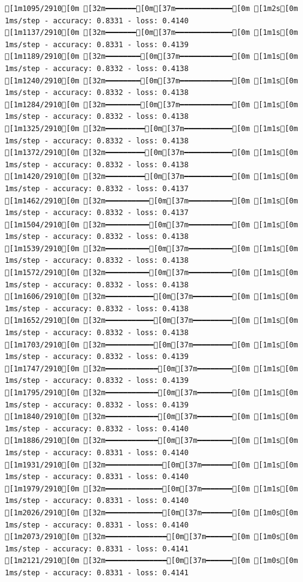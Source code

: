 \documentclass[
  letterpaper,
  DIV=11,
  numbers=noendperiod]{scrartcl}
\begin{document}
\begin{verbatim}
[1m1095/2910[0m [32m━━━━━━━[0m[37m━━━━━━━━━━━━━[0m [1m2s[0m 1ms/step - accuracy: 0.8331 - loss: 0.4140
[1m1137/2910[0m [32m━━━━━━━[0m[37m━━━━━━━━━━━━━[0m [1m1s[0m 1ms/step - accuracy: 0.8331 - loss: 0.4139
[1m1189/2910[0m [32m━━━━━━━━[0m[37m━━━━━━━━━━━━[0m [1m1s[0m 1ms/step - accuracy: 0.8332 - loss: 0.4138
[1m1240/2910[0m [32m━━━━━━━━[0m[37m━━━━━━━━━━━━[0m [1m1s[0m 1ms/step - accuracy: 0.8332 - loss: 0.4138
[1m1284/2910[0m [32m━━━━━━━━[0m[37m━━━━━━━━━━━━[0m [1m1s[0m 1ms/step - accuracy: 0.8332 - loss: 0.4138
[1m1325/2910[0m [32m━━━━━━━━━[0m[37m━━━━━━━━━━━[0m [1m1s[0m 1ms/step - accuracy: 0.8332 - loss: 0.4138
[1m1372/2910[0m [32m━━━━━━━━━[0m[37m━━━━━━━━━━━[0m [1m1s[0m 1ms/step - accuracy: 0.8332 - loss: 0.4138
[1m1420/2910[0m [32m━━━━━━━━━[0m[37m━━━━━━━━━━━[0m [1m1s[0m 1ms/step - accuracy: 0.8332 - loss: 0.4137
[1m1462/2910[0m [32m━━━━━━━━━━[0m[37m━━━━━━━━━━[0m [1m1s[0m 1ms/step - accuracy: 0.8332 - loss: 0.4137
[1m1504/2910[0m [32m━━━━━━━━━━[0m[37m━━━━━━━━━━[0m [1m1s[0m 1ms/step - accuracy: 0.8332 - loss: 0.4138
[1m1539/2910[0m [32m━━━━━━━━━━[0m[37m━━━━━━━━━━[0m [1m1s[0m 1ms/step - accuracy: 0.8332 - loss: 0.4138
[1m1572/2910[0m [32m━━━━━━━━━━[0m[37m━━━━━━━━━━[0m [1m1s[0m 1ms/step - accuracy: 0.8332 - loss: 0.4138
[1m1606/2910[0m [32m━━━━━━━━━━━[0m[37m━━━━━━━━━[0m [1m1s[0m 1ms/step - accuracy: 0.8332 - loss: 0.4138
[1m1652/2910[0m [32m━━━━━━━━━━━[0m[37m━━━━━━━━━[0m [1m1s[0m 1ms/step - accuracy: 0.8332 - loss: 0.4138
[1m1703/2910[0m [32m━━━━━━━━━━━[0m[37m━━━━━━━━━[0m [1m1s[0m 1ms/step - accuracy: 0.8332 - loss: 0.4139
[1m1747/2910[0m [32m━━━━━━━━━━━━[0m[37m━━━━━━━━[0m [1m1s[0m 1ms/step - accuracy: 0.8332 - loss: 0.4139
[1m1795/2910[0m [32m━━━━━━━━━━━━[0m[37m━━━━━━━━[0m [1m1s[0m 1ms/step - accuracy: 0.8332 - loss: 0.4139
[1m1840/2910[0m [32m━━━━━━━━━━━━[0m[37m━━━━━━━━[0m [1m1s[0m 1ms/step - accuracy: 0.8332 - loss: 0.4140
[1m1886/2910[0m [32m━━━━━━━━━━━━[0m[37m━━━━━━━━[0m [1m1s[0m 1ms/step - accuracy: 0.8331 - loss: 0.4140
[1m1931/2910[0m [32m━━━━━━━━━━━━━[0m[37m━━━━━━━[0m [1m1s[0m 1ms/step - accuracy: 0.8331 - loss: 0.4140
[1m1979/2910[0m [32m━━━━━━━━━━━━━[0m[37m━━━━━━━[0m [1m1s[0m 1ms/step - accuracy: 0.8331 - loss: 0.4140
[1m2026/2910[0m [32m━━━━━━━━━━━━━[0m[37m━━━━━━━[0m [1m0s[0m 1ms/step - accuracy: 0.8331 - loss: 0.4140
[1m2073/2910[0m [32m━━━━━━━━━━━━━━[0m[37m━━━━━━[0m [1m0s[0m 1ms/step - accuracy: 0.8331 - loss: 0.4141
[1m2121/2910[0m [32m━━━━━━━━━━━━━━[0m[37m━━━━━━[0m [1m0s[0m 1ms/step - accuracy: 0.8331 - loss: 0.4141

\end{verbatim}
\end{document}
